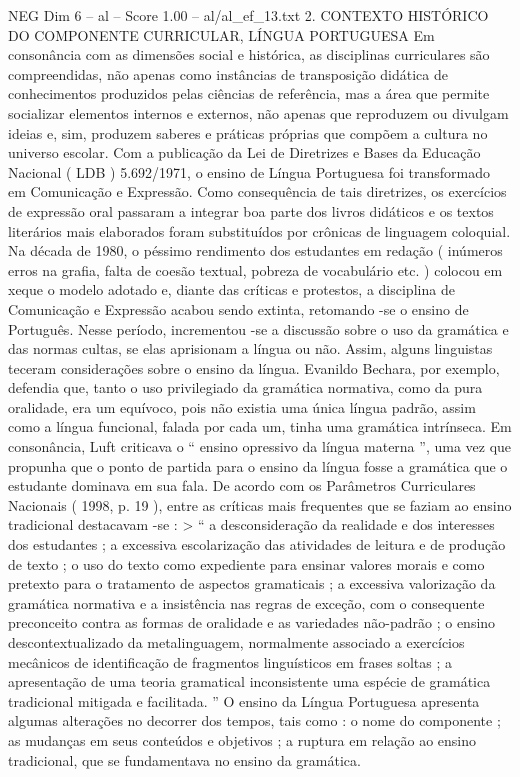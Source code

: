 \begin{textsample}{NEG Dim 6 – al – Score 1.00 – al/al\_ef\_13.txt}  \label{ex:f6_neg_063}
2.
CONTEXTO HISTÓRICO DO COMPONENTE CURRICULAR, LÍNGUA PORTUGUESA Em consonância com as dimensões social e histórica, as disciplinas curriculares são compreendidas, não apenas como instâncias de transposição didática de conhecimentos produzidos pelas ciências de referência, mas a área que permite socializar elementos internos e externos, não apenas que reproduzem ou divulgam ideias e, sim, produzem saberes e práticas próprias que compõem a cultura no universo escolar.
Com a publicação da Lei de Diretrizes e Bases da Educação Nacional ( LDB ) 5.692/1971, o ensino de Língua Portuguesa foi transformado em Comunicação e Expressão.
Como consequência de tais diretrizes, os exercícios de expressão oral passaram a integrar boa parte dos livros didáticos e os textos literários mais elaborados foram substituídos por crônicas de linguagem coloquial.
Na década de 1980, o péssimo rendimento dos estudantes em redação ( inúmeros erros na grafia, falta de coesão textual, pobreza de vocabulário etc. ) colocou em xeque o modelo adotado e, diante das críticas e protestos, a disciplina de Comunicação e Expressão acabou sendo extinta, retomando -se o ensino de Português.
Nesse período, incrementou -se a discussão sobre o uso da gramática e das normas cultas, se elas aprisionam a língua ou não.
Assim, alguns linguistas teceram considerações sobre o ensino da língua.
Evanildo Bechara, por exemplo, defendia que, tanto o uso privilegiado da gramática normativa, como da pura oralidade, era um equívoco, pois não existia uma única língua padrão, assim como a língua funcional, falada por cada um, tinha uma gramática intrínseca.
Em consonância, Luft criticava o “ ensino opressivo da língua materna ”, uma vez que propunha que o ponto de partida para o ensino da língua fosse a gramática que o estudante dominava em sua fala.
De acordo com os Parâmetros Curriculares Nacionais ( 1998, p. 19 ), entre as críticas mais frequentes que se faziam ao ensino tradicional destacavam -se : > “ a desconsideração da realidade e dos interesses dos estudantes ; a excessiva escolarização das atividades de leitura e de produção de texto ; o uso do texto como expediente para ensinar valores morais e como pretexto para o tratamento de aspectos gramaticais ; a excessiva valorização da gramática normativa e a insistência nas regras de exceção, com o consequente preconceito contra as formas de oralidade e as variedades não-padrão ; o ensino descontextualizado da metalinguagem, normalmente associado a exercícios mecânicos de identificação de fragmentos linguísticos em frases soltas ; a apresentação de uma teoria gramatical inconsistente uma espécie de gramática tradicional mitigada e facilitada. ” O ensino da Língua Portuguesa apresenta algumas alterações no decorrer dos tempos, tais como : o nome do componente ; as mudanças em seus conteúdos e objetivos ; a ruptura em relação ao ensino tradicional, que se fundamentava no ensino da gramática.

\end{textsample}
